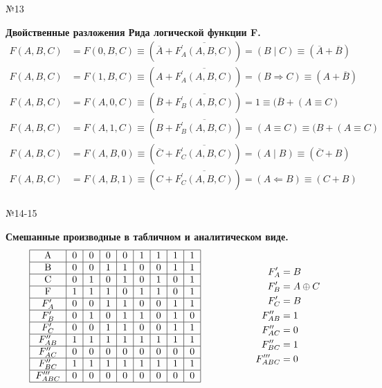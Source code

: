 \documentclass[]{article}
\begin{document}
	\begin{center}\begin{large}{№13}\end{large}\end{center}
	\textbf{Двойственные разложения Рида логической функции F.}
	\[
	\begin{aligned}
	F(A, B, C) &= F(0, B, C)\equiv (\overline{A}+ \overline{F^{'}_A(A,B,C)})=(B\mid C)\equiv (\overline{A} + \overline{B})\\
	F(A, B, C) &= F(1, B, C)\equiv ({A} + \overline{F^{'}_A(A,B,C)})=(B\Rightarrow C)\equiv (A+ \overline{B})\\
	F(A, B, C) &= F(A, 0, C)\equiv (\overline{B}+ \overline{F^{'}_B(A,B,C)})=1\equiv (\overline{B}+(A\equiv C)\\
	F(A, B, C) &= F(A, 1, C)\equiv (B + \overline{F^{'}_B(A,B,C)})=(A\equiv C)\equiv(B+(A\equiv C)\\
	F(A, B, C) &= F(A, B, 0)\equiv (\overline{C} + \overline{F^{'}_C(A,B,C)})=(A\mid B)\equiv (\overline{C} + B)\\
	F(A, B, C) &= F(A, B, 1)\equiv (C + \overline{F^{'}_C(A,B,C)})=(A\Leftarrow B)\equiv (C+ B)\\
	\end{aligned}
	\]
	\begin{center}\begin{large}{№14-15}\end{large}\end{center}		\textbf{Смешанные производные в табличном и аналитическом виде.}
	\[
	\begin{aligned}
	\begin{tabular}{|c|c|c|c|c|c|c|c|c|}
	\hline
A            & 0 & 0 & 0 & 0 & 1 & 1 & 1 & 1 \\ \hline
B            & 0 & 0 & 1 & 1 & 0 & 0 & 1 & 1 \\ \hline
C            & 0 & 1 & 0 & 1 & 0 & 1 & 0 & 1 \\ \hline
F            & 1 & 1 & 1 & 0 & 1 & 1 & 0 & 1 \\ \hline
$F'_A$       & 0 & 0 & 1 & 1 & 0 & 0 & 1 & 1 \\ \hline
$F'_B$       & 0 & 1 & 0 & 1 & 1 & 0 & 1 & 0 \\ \hline
$F'_C$       & 0 & 0 & 1 & 1 & 0 & 0 & 1 & 1 \\ \hline
$F''_{AB}$   & 1 & 1 & 1 & 1 & 1 & 1 & 1 & 1 \\ \hline
$F''_{AC}$   & 0 & 0 & 0 & 0 & 0 & 0 & 0 & 0 \\ \hline
$F''_{BC}$   & 1 & 1 & 1 & 1 & 1 & 1 & 1 & 1 \\ \hline
$F'''_{ABC}$ & 0 & 0 & 0 & 0 & 0 & 0 & 0 & 0 \\ \hline
	\end{tabular}
	&\hspace{2cm}
	\begin{aligned}
	F'_A&=B\\
	F'_B&=A\oplus C\\
	F'_C&=B\\
	F''_{AB}&=1\\
	F''_{AC}&=0\\
	F''_{BC}&=1\\
	F'''_{ABC}&=0
	\end{aligned}
	\end{aligned}
	\]
\end{document}

